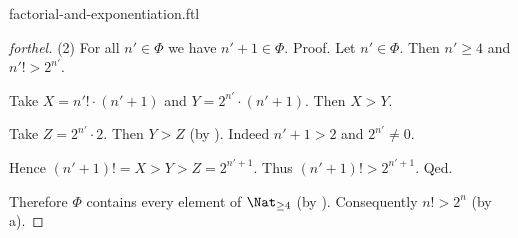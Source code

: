 \documentclass{naproche-library}
\begin{document}
\begin{smodule}[title=Factorial and Exponentiation]{factorial-and-exponentiation.ftl}
\begin{proof}[forthel]
  (2) For all $n' \in \Phi$ we have $n' + 1 \in \Phi$. \newline
  Proof.
    Let $n' \in \Phi$.
    Then $n' \geq 4$ and $n'! > 2^{n'}$.

    Take $X = n'! \cdot (n' + 1)$ and $Y = 2^{n'} \cdot (n' + 1)$.
    Then $X > Y$.

    Take $Z = 2^{n'} \cdot 2$.
    Then $Y > Z$ (by ).
    Indeed $n' + 1 > 2$ and $2^{n'} \neq 0$.

    Hence $(n' + 1)! = X > Y > Z = 2^{n' + 1}$.
    Thus $(n' + 1)! > 2^{n' + 1}$.
  Qed.

  Therefore $\Phi$ contains every element of $\Nat_{\geq 4}$ (by ).
  Consequently $n! > 2^{n}$ (by a).
\end{proof}
\end{smodule}
\end{document}
